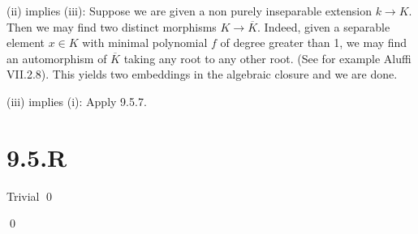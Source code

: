 \documentclass{article}
\begin{document}
(ii) implies (iii):
Suppose we are given a non purely inseparable extension
$k \to K$. Then we may find two distinct morphisms
$K \to \overline{K}$. Indeed, given a separable element
$x \in K$ with minimal polynomial $f$ of
degree greater than 1, we may find an automorphism of $\overline{K}$
taking any root to any other root. (See for example Aluffi VII.2.8). This
yields two embeddings in the algebraic closure and we are done.

(iii) implies (i):
Apply 9.5.7.

\section{9.5.R}
Trivial \qed

\qed
\end{document}
